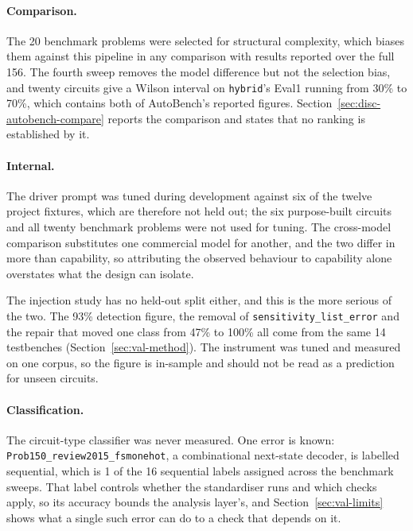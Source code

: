 \documentclass[11pt,a4paper,titlepage=false]{scrreprt}
\begin{document}
\paragraph{Comparison.} The 20 benchmark problems were selected for structural complexity,
which biases them against this pipeline in any comparison with results reported over the full
156. The fourth sweep removes the model difference but not the selection bias, and twenty
circuits give a Wilson interval on \texttt{hybrid}'s Eval1 running from 30\% to 70\%, which
contains both of AutoBench's reported figures. Section~\ref{sec:disc-autobench-compare}
reports the comparison and states that no ranking is established by it.

\paragraph{Internal.} The driver prompt was tuned during development against six of the
twelve project fixtures, which are therefore not held out; the six purpose-built circuits
and all twenty benchmark problems were not used for tuning. The cross-model comparison
substitutes one commercial model for another, and the two differ in more than capability,
so attributing the observed behaviour to capability alone overstates what the design can
isolate.

The injection study has no held-out split either, and this is the more serious of the two.
The 93\% detection figure, the removal of \texttt{sensitivity\_list\_error} and the repair
that moved one class from 47\% to 100\% all come from the same 14 testbenches
(Section~\ref{sec:val-method}). The instrument was tuned and measured on one corpus, so the
figure is in-sample and should not be read as a prediction for unseen circuits.

\paragraph{Classification.} The circuit-type classifier was never measured. One error is
known: \texttt{Prob150\_\allowbreak review2015\_\allowbreak fsmonehot}, a combinational
next-state decoder, is labelled sequential, which is 1 of the 16 sequential labels assigned across the benchmark
sweeps. That label controls whether the standardiser runs and which checks apply, so its
accuracy bounds the analysis layer's, and Section~\ref{sec:val-limits} shows what a single
such error can do to a check that depends on it.
\end{document}
